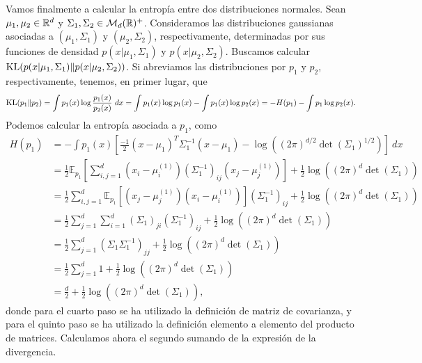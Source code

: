 Vamos finalmente a calcular la entropía entre dos distribuciones normales. Sean $\mu_1,\mu_2 \in \mathbb{R}^d$ y $\Sigma_1,\Sigma_2 \in \mathcal{M}_d(\mathbb{R})^+$. Consideramos las distribuciones gaussianas asociadas a $(\mu_1,\Sigma_1)$ y $(\mu_2,\Sigma_2)$, respectivamente, determinadas por sus funciones de densidad $p(x|\mu_1,\Sigma_1)$ y $p(x|\mu_2,\Sigma_2)$. Buscamos calcular $\operatorname{KL}(p(x|\mu_1,\Sigma_1)\|p(x|\mu_2,\Sigma_2))$. Si abreviamos las distribuciones por $p_1$ y $p_2$, respectivamente, tenemos, en primer lugar, que
\[ \operatorname{KL}(p_1\|p_2) = \int p_1(x)\log\frac{p_1(x)}{p_2(x)}\ dx = \int p_1(x) \log p_1(x) - \int p_1(x) \log p_2(x) = -H(p_1) - \int p_1 \log p_2(x). \]
Podemos calcular la entropía asociada a $p_1$, como
\begin{equation} \label{eq:kl_gaussian:sum_1}
\begin{split}
 H(p_1) &= - \int p_1(x) \left[ \frac{-1}{2}(x-\mu_1)^T\Sigma_1^{-1}(x-\mu_1) - \log((2\pi)^{d/2}\det(\Sigma_1)^{1/2}) \right] \ dx \\
        &= \frac{1}{2} \mathbb{E}_{p_1}\left[ \sum_{i,j=1}^d (x_i - \mu_i^{(1)}) (\Sigma_1^{-1})_{ij}(x_j - \mu_j^{(1)})\right] + \frac{1}{2}\log((2\pi)^d\det(\Sigma_1)) \\
        &= \frac{1}{2} \sum_{i,j=1}^d\mathbb{E}_{p_1}[(x_j - \mu_j^{(1)})(x_i - \mu_i^{(1)})](\Sigma_1^{-1})_{ij} + \frac{1}{2}\log((2\pi)^d\det(\Sigma_1)) \\
        &= \frac{1}{2} \sum_{j=1}^d\sum_{i=1}^d (\Sigma_1)_{ji}(\Sigma_1^{-1})_{ij} + \frac{1}{2}\log((2\pi)^d\det(\Sigma_1)) \\
        &= \frac{1}{2} \sum_{j=1}^d (\Sigma_1\Sigma_1^{-1})_{jj} + \frac{1}{2}\log((2\pi)^d\det(\Sigma_1)) \\
        &= \frac{1}{2} \sum_{j=1}^d 1 + \frac{1}{2}\log((2\pi)^d\det(\Sigma_1)) \\
        &= \frac{d}{2} + \frac{1}{2}\log((2\pi)^d\det(\Sigma_1)),
\end{split}
\end{equation}
donde para el cuarto paso se ha utilizado la definición de matriz de covarianza, y para el quinto paso se ha utilizado la definición elemento a elemento del producto de matrices. Calculamos ahora el segundo sumando de la expresión de la divergencia.
